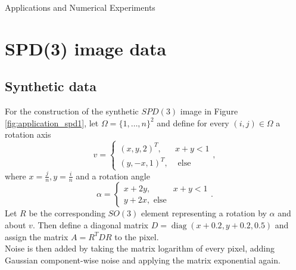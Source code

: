 \begin{chapter}{Applications and Numerical Experiments}


\FloatBarrier
\section{SPD(3) image data} %
\label{sec:SPD(3) image data}

\subsection{Synthetic data} %
\label{sub:Synthetic data}
For the construction of the synthetic $SPD(3)$ image in Figure \ref{fig:application_spd1}, let $\Omega=\lbrace 1,\ldots,n \rbrace^2$ and define for every $(i,j)\in\Omega$
a rotation axis
\begin{equation}
	v = \begin{cases}
	    (x,y,2)^{T}, & x+y<1\\
	    (y,-x,1)^{T}, & \text{ else}
	\end{cases},
\end{equation}
where $x=\frac{j}{n}, y=\frac{i}{n}$ and a rotation angle
\begin{equation}
    \alpha = \begin{cases}
	   x+2y, & x+y<1\\
	   y+2x, \text{ else}
    \end{cases}.
\end{equation}
Let $R$ be the corresponding $SO(3)$ element representing a rotation by $\alpha$ and about $v$. Then define a diagonal matrix $D=\operatorname{diag}(x+0.2,y+0.2,0.5)$
and assign the matrix $A=R^{T}DR$ to the pixel.\\
Noise is then added by taking the matrix logarithm of every pixel, adding Gaussian component-wise noise and applying the matrix exponential again.
\begin{figure}[h!]
    \centering
\end{figure}
\end{chapter}
